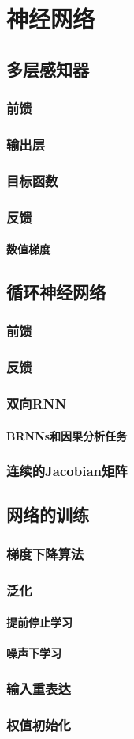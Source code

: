 \chapter{神经网络}
\section{多层感知器}
\subsection{前馈}
\subsection{输出层}
\subsection{目标函数}
\subsection{反馈}
\subsubsection{数值梯度}
\section{循环神经网络}
\subsection{前馈}
\subsection{反馈}
\subsection{双向RNN}
\subsubsection{BRNNs和因果分析任务}
\subsection{连续的Jacobian矩阵}
\section{网络的训练}
\subsection{梯度下降算法}
\subsection{泛化}
\subsubsection{提前停止学习}
\subsubsection{噪声下学习}
\subsection{输入重表达}
\subsection{权值初始化}